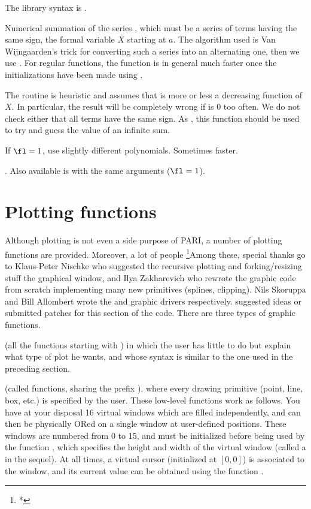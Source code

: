 The library syntax is .

\label{se:sumpos}
Numerical summation of the series , which must be a series of
terms having the same sign, the formal variable $X$ starting at $a$. The
algorithm used is Van Wijngaarden's trick for converting such a series into
an alternating one, then we use . For regular functions, the
function  is in general much faster once the initializations
have been made using .

The routine is heuristic and assumes that  is more or less a
decreasing function of $X$. In particular, the result will be completely
wrong if  is 0 too often. We do not check either that all terms
have the same sign. As , this function should be used to
try and guess the value of an infinite sum.

If $\fl=1$, use slightly different polynomials. Sometimes faster.

. Also
available is  with the same arguments ($\fl = 1$).

\section{Plotting functions}

  Although plotting is not even a side purpose of PARI, a number of plotting
functions are provided. Moreover, a lot of people
\footnote{*}{Among these, special thanks go to Klaus-Peter Nischke who
suggested the recursive plotting and forking/resizing stuff the graphical
window, and Ilya Zakharevich who rewrote the graphic code from scratch
implementing many new primitives (splines, clipping). Nils Skoruppa and Bill
Allombert wrote the  and  graphic drivers respectively.}
suggested ideas or submitted patches for this section of the code. There are
three types of graphic functions.

 (all the functions starting with
) in which the user has little to do but explain what type of plot
he wants, and whose syntax is similar to the one used in the preceding
section.

 (called  functions,
sharing the prefix ), where every drawing primitive (point, line,
box, etc.) is specified by the user. These low-level functions work as
follows. You have at your disposal 16 virtual windows which are filled
independently, and can then be physically ORed on a single window at
user-defined positions. These windows are numbered from 0 to 15, and must be
initialized before being used by the function , which specifies
the height and width of the virtual window (called a  in the
sequel). At all times, a virtual cursor (initialized at $[0,0]$) is associated
to the window, and its current value can be obtained using the function
.

